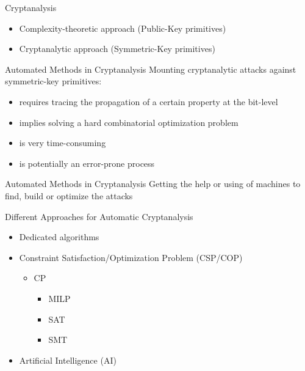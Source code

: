 \documentclass[table,aspectratio=169]{beamer}
\begin{document}
\begin{frame}{Cryptanalysis}
\begin{itemize}
\item Complexity-theoretic approach (Public-Key primitives)
\item Cryptanalytic approach (Symmetric-Key primitives)
\end{itemize}
\end{frame}

\begin{frame}{Automated Methods in Cryptanalysis}
Mounting cryptanalytic attacks against symmetric-key primitives:
\begin{itemize}
\item requires tracing the propagation of a certain property at the bit-level
\item implies solving a hard combinatorial optimization problem
\item is very time-consuming
\item is potentially an error-prone process
\end{itemize}
\pause
\vspace{-0.4cm}
\begin{block}{Automated Methods in Cryptanalysis}
Getting the help or using of machines to \textcolor{tugred}{find}, \textcolor{tugblue}{build} or \textcolor{tuggreen}{optimize} the attacks
\end{block}
\end{frame}

\begin{frame}{Different Approaches for Automatic Cryptanalysis}
\begin{itemize}
\item Dedicated algorithms
\item { Constraint Satisfaction/Optimization Problem (CSP/COP)}
\begin{itemize}
\item {\color<2>{tugred} CP}
\begin{itemize}
\item { MILP}
\item {\color<2>{tugred} SAT}
\item { SMT}
\end{itemize}
\end{itemize}
\item Artificial Intelligence (AI)
\end{itemize}
\end{frame}
  
\end{document}
